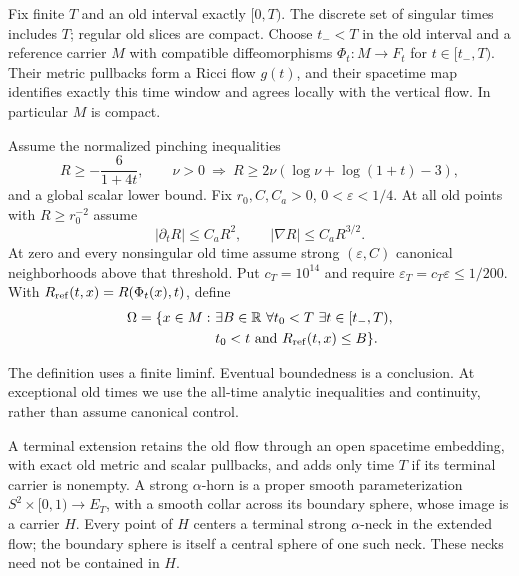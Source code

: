Fix finite $T$ and an old interval exactly $[0,T)$. The discrete set of
singular times includes $T$; regular old slices are compact. Choose
$t_-<T$ in the old interval and a reference carrier $M$ with compatible
diffeomorphisms $\Phi_t:M\to F_t$ for $t\in[t_-,T)$. Their metric
pullbacks form a Ricci flow $g(t)$, and their spacetime map identifies
exactly this time window and agrees locally with the vertical flow.
In particular $M$ is compact.

\begin{definition}
\label{def:singular-retained-region}
Assume the normalized pinching inequalities
\[
 R\geq-\frac6{1+4t},\qquad
 \nu>0\ \Longrightarrow\ R\geq2\nu(\log\nu+\log(1+t)-3),
\]
and a global scalar lower bound. Fix $r_0,C,C_a>0$, $0<\varepsilon<1/4$.
At all old points with $R\geq r_0^{-2}$ assume
\begin{equation}
 |\partial_tR|\leq C_aR^2,\qquad |\nabla R|\leq C_aR^{3/2}.
 \label{eq:singular-analytic-bounds}
\end{equation}
At zero and every nonsingular old time assume strong
$(\varepsilon,C)$ canonical neighborhoods above that threshold.
Put $c_T=10^{14}$ and require $\varepsilon_T=c_T\varepsilon\leq1/200$.
With $R_{\rm ref}(t,x)=R(\Phi_t(x),t)$, define
\begin{equation}
 \begin{split}
 \Omega=\{x\in M:\ &\exists B\in\mathbb R\ \forall t_0<T\
 \exists t\in[t_-,T),\\
 &t_0<t\text{ and }R_{\rm ref}(t,x)\leq B\}.
 \end{split}
 \label{eq:singular-retained-region}
\end{equation}
\end{definition}

The definition uses a finite liminf. Eventual boundedness is a conclusion.
At exceptional old times we use the all-time analytic inequalities and
continuity, rather than assume canonical control.

\begin{definition}
\label{def:singular-terminal-horn}
\uses{def:singular-retained-region}
A terminal extension retains the old flow through an open spacetime
embedding, with exact old metric and scalar pullbacks, and adds only time
$T$ if its terminal carrier is nonempty. A strong $\alpha$-horn is a
proper smooth parameterization $S^2\times[0,1)\to E_T$, with a smooth
collar across its boundary sphere, whose image is a carrier $H$.
Every point of $H$ centers a terminal strong $\alpha$-neck in the extended
flow; the boundary sphere is itself a central sphere of one such neck.
These necks need not be contained in $H$.
\end{definition}

